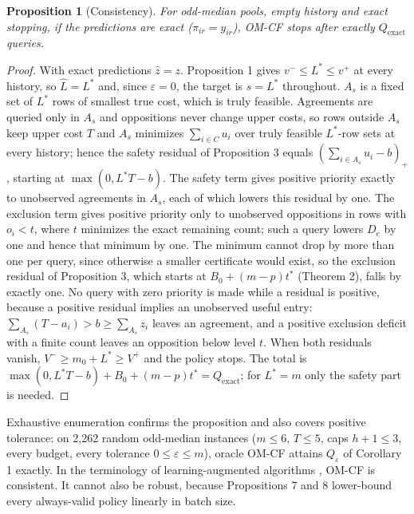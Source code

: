 \documentclass[11pt]{article}
\newtheorem{proposition}{Proposition}
\newcommand{\Qx}{Q_{\mathrm{exact}}}
\begin{document}
\begin{proposition}[Consistency]
\label{prop:omcf}
For odd-median pools, empty history and exact stopping, if the predictions are exact ($\pi_{ir}=y_{ir}$), OM-CF stops after exactly $\Qx$ queries.
\end{proposition}
\begin{proof}
With exact predictions $\hat z=z$. Proposition 1 gives $v^-\le L^*\le v^+$ at every history, so $\hat L=L^*$ and, since $\varepsilon=0$, the target is $s=L^*$ throughout. $A_s$ is a fixed set of $L^*$ rows of smallest true cost, which is truly feasible. Agreements are queried only in $A_s$ and oppositions never change upper costs, so rows outside $A_s$ keep upper cost $T$ and $A_s$ minimizes $\sum_{i\in C}u_i$ over truly feasible $L^*$-row sets at every history; hence the safety residual of Proposition 3 equals $(\sum_{i\in A_s}u_i-b)_+$, starting at $\max(0,L^*T-b)$. The safety term gives positive priority exactly to unobserved agreements in $A_s$, each of which lowers this residual by one. The exclusion term gives positive priority only to unobserved oppositions in rows with $o_i<t$, where $t$ minimizes the exact remaining count; such a query lowers $D_e$ by one and hence that minimum by one. The minimum cannot drop by more than one per query, since otherwise a smaller certificate would exist, so the exclusion residual of Proposition 3, which starts at $B_0+(m-p)t^*$ (Theorem 2), falls by exactly one. No query with zero priority is made while a residual is positive, because a positive residual implies an unobserved useful entry: $\sum_{A_s}(T-a_i)>b\ge\sum_{A_s}z_i$ leaves an agreement, and a positive exclusion deficit with a finite count leaves an opposition below level $t$. When both residuals vanish, $V^-\ge m_0+L^*\ge V^+$ and the policy stops. The total is $\max(0,L^*T-b)+B_0+(m-p)t^*=\Qx$; for $L^*=m$ only the safety part is needed.
\end{proof}
Exhaustive enumeration confirms the proposition and also covers positive tolerance: on 2,262 random odd-median instances ($m\le6$, $T\le5$, caps $h+1\le3$, every budget, every tolerance $0\le\varepsilon\le m$), oracle OM-CF attains $Q_\varepsilon$ of Corollary 1 exactly. In the terminology of learning-augmented algorithms \citep{lykouris2018caching,purohit2018predictions}, OM-CF is consistent. It cannot also be robust, because Propositions 7 and 8 lower-bound every always-valid policy linearly in batch size.
\end{document}
